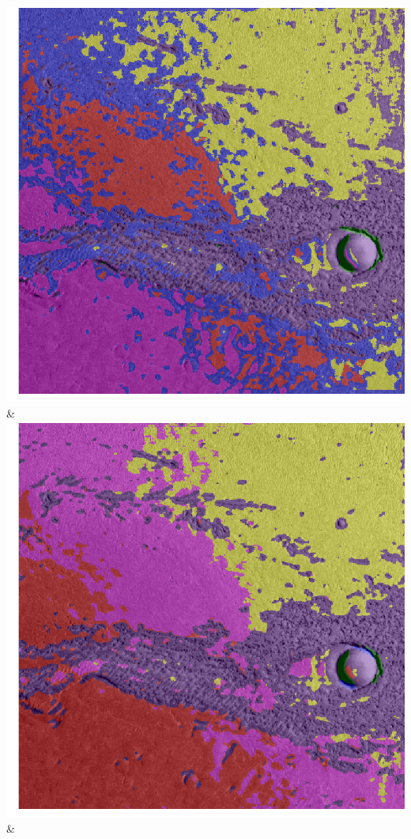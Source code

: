 \begin{table}[h!]
\begin{tabularx}{\textwidth}
		\includegraphics[width=0.9\linewidth]{images/gen/convolution_number/p03_02.png_3.png} &
		\includegraphics[width=0.9\linewidth]{images/gen/convolution_number/p03_02.png_4.png} &

\end{tabularx}
\end{table}
